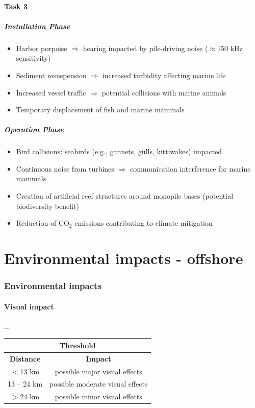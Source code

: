 \documentclass{article}
\begin{document}
\subsection*{Task 3}
\subsubsection*{Installation Phase}
\begin{itemize}
    \item Harbor porpoise $\Rightarrow$ hearing impacted by pile-driving noise ($\approx$150 kHz sensitivity)
    \item Sediment resuspension $\Rightarrow$ increased turbidity affecting marine life
    \item Increased vessel traffic $\Rightarrow$ potential collisions with marine animals
    \item Temporary displacement of fish and marine mammals
\end{itemize}

\subsubsection*{Operation Phase}
\begin{itemize}
    \item Bird collisions: seabirds (e.g., gannets, gulls, kittiwakes) impacted
    \item Continuous noise from turbines $\Rightarrow$ communication interference for marine mammals
    \item Creation of artificial reef structures around monopile bases (potential biodiversity benefit)
    \item Reduction of CO$_2$ emissions contributing to climate mitigation
\end{itemize}

\newpage
\part{Environmental impacts - offshore}
\section{Environmental impacts}
\subsection{Visual impact}
...

\begin{center}
    \begin{tabular}{|c|c|}
        \hline
        \multicolumn{2}{|c|}{\textbf{Threshold}}\\
        \hline
        \textbf{Distance} & \textbf{Impact}\\
        \hline
        $<$13 km & possible major visual effects\\
        \hline
        13 -- 24 km & possible moderate visual effects\\
        \hline
        $>$24 km & possible minor visual effects\\
        \hline
    \end{tabular}
\end{center}
\end{document}
